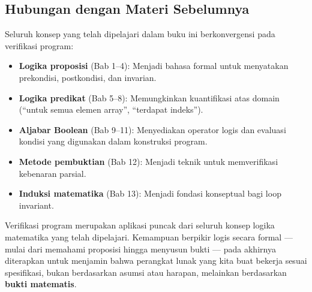 \subsection{Hubungan dengan Materi Sebelumnya}

Seluruh konsep yang telah dipelajari dalam buku ini berkonvergensi pada verifikasi program:

\begin{itemize}
    \item \textbf{Logika proposisi} (Bab 1--4): Menjadi bahasa formal untuk menyatakan prekondisi, postkondisi, dan invarian.
    \item \textbf{Logika predikat} (Bab 5--8): Memungkinkan kuantifikasi atas domain (``untuk semua elemen array'', ``terdapat indeks'').
    \item \textbf{Aljabar Boolean} (Bab 9--11): Menyediakan operator logis dan evaluasi kondisi yang digunakan dalam konstruksi program.
    \item \textbf{Metode pembuktian} (Bab 12): Menjadi teknik untuk memverifikasi kebenaran parsial.
    \item \textbf{Induksi matematika} (Bab 13): Menjadi fondasi konseptual bagi loop invariant.
\end{itemize}

\begin{konsep}
Verifikasi program merupakan aplikasi puncak dari seluruh konsep logika matematika yang telah dipelajari. Kemampuan berpikir logis secara formal --- mulai dari memahami proposisi hingga menyusun bukti --- pada akhirnya diterapkan untuk menjamin bahwa perangkat lunak yang kita buat bekerja sesuai spesifikasi, bukan berdasarkan asumsi atau harapan, melainkan berdasarkan \textbf{bukti matematis}.
\end{konsep}
